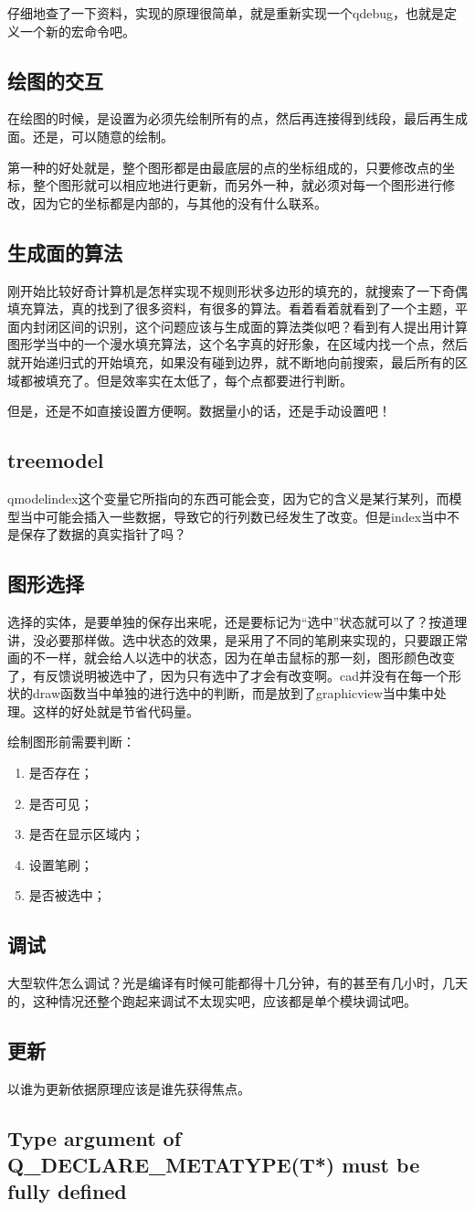 仔细地查了一下资料，实现的原理很简单，就是重新实现一个qdebug，也就是定义一个新的宏命令吧。
\subsection{绘图的交互}
在绘图的时候，是设置为必须先绘制所有的点，然后再连接得到线段，最后再生成面。还是，可以随意的绘制。

第一种的好处就是，整个图形都是由最底层的点的坐标组成的，只要修改点的坐标，整个图形就可以相应地进行更新，而另外一种，就必须对每一个图形进行修改，因为它的坐标都是内部的，与其他的没有什么联系。
\subsection{生成面的算法}
刚开始比较好奇计算机是怎样实现不规则形状多边形的填充的，就搜索了一下奇偶填充算法，真的找到了很多资料，有很多的算法。看着看着就看到了一个主题，平面内封闭区间的识别，这个问题应该与生成面的算法类似吧？看到有人提出用计算图形学当中的一个漫水填充算法，这个名字真的好形象，在区域内找一个点，然后就开始递归式的开始填充，如果没有碰到边界，就不断地向前搜索，最后所有的区域都被填充了。但是效率实在太低了，每个点都要进行判断。

但是，还是不如直接设置方便啊。数据量小的话，还是手动设置吧！
\subsection{treemodel}
qmodelindex这个变量它所指向的东西可能会变，因为它的含义是某行某列，而模型当中可能会插入一些数据，导致它的行列数已经发生了改变。但是index当中不是保存了数据的真实指针了吗？
\subsection{图形选择}
选择的实体，是要单独的保存出来呢，还是要标记为“选中”状态就可以了？按道理讲，没必要那样做。选中状态的效果，是采用了不同的笔刷来实现的，只要跟正常画的不一样，就会给人以选中的状态，因为在单击鼠标的那一刻，图形颜色改变了，有反馈说明被选中了，因为只有选中了才会有改变啊。cad并没有在每一个形状的draw函数当中单独的进行选中的判断，而是放到了graphicview当中集中处理。这样的好处就是节省代码量。

绘制图形前需要判断：
\begin{enumerate}
	\item 是否存在；
	\item 是否可见；
	\item 是否在显示区域内；
	\item 设置笔刷；
	\item 是否被选中；
\end{enumerate}
\subsection{调试}
大型软件怎么调试？光是编译有时候可能都得十几分钟，有的甚至有几小时，几天的，这种情况还整个跑起来调试不太现实吧，应该都是单个模块调试吧。
\subsection{更新}
以谁为更新依据原理应该是谁先获得焦点。
\subsection{Type argument of Q_DECLARE_METATYPE(T*) must be fully defined}

\subsection{}